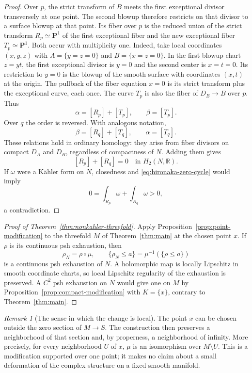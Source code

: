 \documentclass[11pt]{amsart}
\theoremstyle{definition}
\theoremstyle{remark}
\newtheorem{remark}[theorem]{Remark}
\numberwithin{equation}{section}
\newcommand{\R}{\mathbb R}
\newcommand{\PP}{\mathbf P}
\begin{document}
\begin{proof}
Over $p$, the strict transform of $B$ meets the first exceptional
divisor transversely at one point.  The second blowup therefore
restricts on that divisor to a surface blowup at that point.  Its
fiber over $p$ is the reduced union of the strict transform
$R_p\simeq\PP^1$ of the first exceptional fiber and the new
exceptional fiber $T_p\simeq\PP^1$. Both occur with multiplicity one.
Indeed, take local coordinates $(x,y,z)$ with
$A=\{y=z=0\}$ and $B=\{x=z=0\}$. In the first blowup chart
$z=yt$, the first exceptional divisor is $y=0$ and the second center
is $x=t=0$. Its restriction to $y=0$ is the blowup of the smooth
surface with coordinates $(x,t)$ at the origin. The pullback of the
fiber equation $x=0$ is its strict transform plus the exceptional
curve, each once. The curve $T_p$ is also the fiber of $D_B\to B$
over $p$. Thus
\[
 \alpha=[R_p]+[T_p],\qquad \beta=[T_p].
\]
Over $q$ the order is reversed.  With analogous notation,
\[
 \beta=[R_q]+[T_q],\qquad \alpha=[T_q].
\]
These relations hold in ordinary homology: they arise from fiber
divisors on compact $D_A$ and $D_B$, regardless of compactness of $N$.
Adding them gives
\begin{equation}\label{eq:hironaka-zero-cycle}
 [R_p]+[R_q]=0\quad\text{in }H_2(N,\R).
\end{equation}
If $\omega$ were a K\"ahler form on $N$, closedness and
\eqref{eq:hironaka-zero-cycle} would imply
\[
 0=\int_{R_p}\omega+\int_{R_q}\omega>0,
\]
a contradiction.
\end{proof}

\begin{proof}[Proof of Theorem~\ref{thm:nonkahler-threefold}]
Apply Proposition~\ref{prop:point-modification} to the threefold $M$
of Theorem~\ref{thm:main} at the chosen point $x$.  If $\rho$ is its
continuous psh exhaustion, then
\[
 \rho_N=\rho\circ\mu,\qquad
 \{\rho_N\le a\}=\mu^{-1}(\{\rho\le a\})
\]
is a continuous psh exhaustion of $N$.  A holomorphic map is locally
Lipschitz in smooth coordinate charts, so local Lipschitz regularity
of the exhaustion is preserved.  A $C^2$ psh
exhaustion on $N$ would give one on $M$ by
Proposition~\ref{prop:compact-modification} with $K=\{x\}$, contrary
to Theorem~\ref{thm:main}.
\end{proof}

\begin{remark}[The sense in which the change is local]
The point $x$ can be chosen outside the zero section of $M\to S$.
The construction then preserves a neighborhood of that section and,
by properness, a neighborhood of infinity.  More precisely, for every
neighborhood $U$ of $x$, $\mu$ is an isomorphism over $M\setminus U$.
This is a modification supported over one point; it makes no claim
about a small deformation of the complex structure on a fixed smooth
manifold.
\end{remark}
\end{document}
